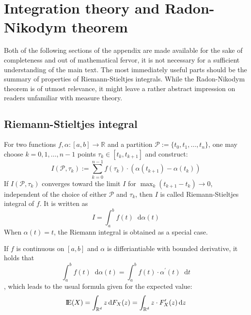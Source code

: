 \documentclass[12pt]{article}
\newcommand*\diff{\mathop{}\!\mathrm{d}}
\newcommand{\E}{\mbox{I\negthinspace E}}
\begin{document}
\section{Integration theory and Radon-Nikodym theorem}
Both of the following sections of the appendix are made available for the sake of completeness and out of mathematical fervor, it is not necessary for a sufficient understanding of the main text. The most immediately useful parts should be the summary of properties of Riemann-Stieltjes integrals. While the Radon-Nikodym theorem is of utmost relevance, it might leave a rather abstract impression on readers unfamiliar with measure theory.

\subsection{Riemann-Stieltjes integral}
For two functions $f, \alpha : \left[ a, b\right] \to \mathbb{R}$ and a partition $\mathscr{P} := \{ t_0, t_1, \dots , t_n\}$, one may choose $k = 0, 1, \dots, n-1$ points $\tau_k \in \left[ t_k, t_{k+1}\right]$ and construct:
\[
I(\mathscr{P}, \tau_k):= \sum_{k = 0}^{n - 1} f(\tau_ k)\cdot (\alpha (t_{k + 1}) - \alpha (t_k))
\]
If $I(\mathscr{P}, \tau_k)$ converges toward the limit $I$ for $ \max_k (t_{k+1}-t_k) \to 0$,  independent of the choice of either $\mathscr{P}$ and $\tau_k$, then $I$ is called Riemann-Stieltjes integral of $f$. It is written as 
\[
I = \int_a^b f(t) \diff \alpha (t)
\]
When $\alpha (t) = t$, the Riemann integral is obtained as a special case.

If $f$ is continuous on $\left[ a, b\right]$ and $\alpha$ is differiantiable with bounded derivative, it holds that
\[
\int_a^b f(t) \diff \alpha (t) = \int_a^b f(t) \cdot \alpha^{\prime} (t) \diff t
\]
, which leads to the usual formula given for the expected value:
\[
\E (X) = \int_{\mathbb{R}^d } z \diff F_X(z) = \int_{\mathbb{R}^d } z \cdot F_X^{\prime}(z)\diff z
\]
\newpage
\end{document}
